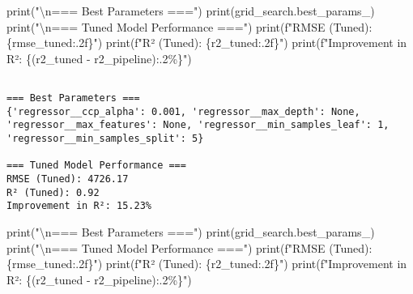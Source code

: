 \documentclass[
  letterpaper,
  DIV=11,
  numbers=noendperiod]{scrreprt}
\newenvironment{Shaded}{\begin{snugshade}}{\end{snugshade}}
\newcommand{\BuiltInTok}[1]{\textcolor[rgb]{0.00,0.23,0.31}{#1}}
\newcommand{\CharTok}[1]{\textcolor[rgb]{0.13,0.47,0.30}{#1}}
\newcommand{\NormalTok}[1]{\textcolor[rgb]{0.00,0.23,0.31}{#1}}
\newcommand{\OperatorTok}[1]{\textcolor[rgb]{0.37,0.37,0.37}{#1}}
\newcommand{\SpecialCharTok}[1]{\textcolor[rgb]{0.37,0.37,0.37}{#1}}
\newcommand{\SpecialStringTok}[1]{\textcolor[rgb]{0.13,0.47,0.30}{#1}}
\newcommand{\StringTok}[1]{\textcolor[rgb]{0.13,0.47,0.30}{#1}}
\begin{document}
\begin{Shaded}
\begin{Highlighting}[]
\BuiltInTok{print}\NormalTok{(}\StringTok{"}\CharTok{\textbackslash{}n}\StringTok{=== Best Parameters ==="}\NormalTok{)}
\BuiltInTok{print}\NormalTok{(grid\_search.best\_params\_)}
\BuiltInTok{print}\NormalTok{(}\StringTok{"}\CharTok{\textbackslash{}n}\StringTok{=== Tuned Model Performance ==="}\NormalTok{)}
\BuiltInTok{print}\NormalTok{(}\SpecialStringTok{f"RMSE (Tuned): }\SpecialCharTok{\{}\NormalTok{rmse\_tuned}\SpecialCharTok{:.2f\}}\SpecialStringTok{"}\NormalTok{)}
\BuiltInTok{print}\NormalTok{(}\SpecialStringTok{f"R² (Tuned): }\SpecialCharTok{\{}\NormalTok{r2\_tuned}\SpecialCharTok{:.2f\}}\SpecialStringTok{"}\NormalTok{)}
\BuiltInTok{print}\NormalTok{(}\SpecialStringTok{f"Improvement in R²: }\SpecialCharTok{\{}\NormalTok{(r2\_tuned }\OperatorTok{{-}}\NormalTok{ r2\_pipeline)}\SpecialCharTok{:.2\%\}}\SpecialStringTok{"}\NormalTok{)}
\end{Highlighting}
\end{Shaded}

\begin{verbatim}

=== Best Parameters ===
{'regressor__ccp_alpha': 0.001, 'regressor__max_depth': None, 'regressor__max_features': None, 'regressor__min_samples_leaf': 1, 'regressor__min_samples_split': 5}

=== Tuned Model Performance ===
RMSE (Tuned): 4726.17
R² (Tuned): 0.92
Improvement in R²: 15.23%
\end{verbatim}

\begin{Shaded}
\begin{Highlighting}[]
\BuiltInTok{print}\NormalTok{(}\StringTok{"}\CharTok{\textbackslash{}n}\StringTok{=== Best Parameters ==="}\NormalTok{)}
\BuiltInTok{print}\NormalTok{(grid\_search.best\_params\_)}
\BuiltInTok{print}\NormalTok{(}\StringTok{"}\CharTok{\textbackslash{}n}\StringTok{=== Tuned Model Performance ==="}\NormalTok{)}
\BuiltInTok{print}\NormalTok{(}\SpecialStringTok{f"RMSE (Tuned): }\SpecialCharTok{\{}\NormalTok{rmse\_tuned}\SpecialCharTok{:.2f\}}\SpecialStringTok{"}\NormalTok{)}
\BuiltInTok{print}\NormalTok{(}\SpecialStringTok{f"R² (Tuned): }\SpecialCharTok{\{}\NormalTok{r2\_tuned}\SpecialCharTok{:.2f\}}\SpecialStringTok{"}\NormalTok{)}
\BuiltInTok{print}\NormalTok{(}\SpecialStringTok{f"Improvement in R²: }\SpecialCharTok{\{}\NormalTok{(r2\_tuned }\OperatorTok{{-}}\NormalTok{ r2\_pipeline)}\SpecialCharTok{:.2\%\}}\SpecialStringTok{"}\NormalTok{)}
\end{Highlighting}
\end{Shaded}
\end{document}

